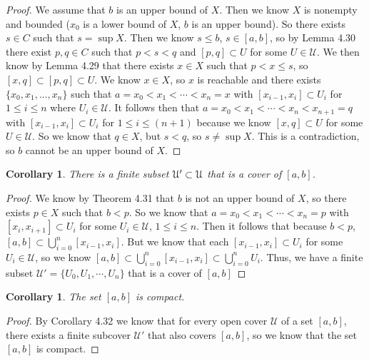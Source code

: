 \documentclass[12pt]{article}
\renewcommand{\_}[1]{\underline{ #1 }}
\newtheorem{corollary}[theorem]{Corollary}
\theoremstyle{definition}
\numberwithin{equation}{subsection}
\begin{document}
\begin{proof}
We assume that $b$ is an upper bound of $X$. Then we know $X$ is nonempty and bounded ($x_0$ is a lower bound of $X$, $b$ is an upper bound). So there exists $s \in C$ such that $s = \sup X$. Then we know $s \leq b$, $s \in [a,b]$, so by Lemma 4.30 there exist $p,q \in C$ such that $p < s < q$ and $[p,q] \subset U$ for some $U \in \mathcal{U}$. We then know by Lemma 4.29 that there exists $x \in X$ such that $p < x \leq s$, so $[x,q] \subset [p,q] \subset U$. We know $x \in X$, so $x$ is reachable and there exists $\{x_0,x_1,...,x_n\}$ such that $a = x_0 < x_1 < \dotsm < x_n = x$ with $[x_{i-1},x_i] \subset U_i$ for $1 \leq i \leq n$ where $U_i \in \mathcal{U}$. It follows then that $a = x_0 < x_1 < \dotsm < x_n < x_{n+1} = q$ with $[x_{i-1},x_i] \subset U_i$ for $1 \leq i \leq (n + 1)$ because we know $[x,q] \subset U$ for some $U \in \mathcal{U}$. So we know that $q \in X$, but $s < q$, so $s \not = \sup X$. This is a contradiction, so $b$ cannot be an upper bound of $X$.
\end{proof}

\begin{corollary}
There is a finite subset $\mathcal U'\subset\mathcal U$ that is a cover of $[a,b]$.
\end{corollary}

\begin{proof}
We know by Theorem 4.31 that $b$ is not an upper bound of $X$, so there exists $p \in X$ such that $b < p$. So we know that $a = x_0 < x_1 < \dotsm < x_n = p$ with $[x_i, x_{i+1}] \subset U_i$ for some $U_i \in \mathcal{U}$, $1 \leq i \leq n$. Then it follows that because $b < p$, $[a,b] \subset \bigcup_{i = 0}^{n} [x_{i-1},x_i]$. But we know that each $[x_{i-1},x_i] \subset U_i$ for some $U_i \in \mathcal{U}$, so we know $[a,b] \subset \bigcup_{i = 0}^{n} [x_{i-1},x_i] \subset \bigcup_{i = 0}^{n}U_i$. Thus, we have a finite subset $\mathcal{U'} = \{U_0, U_1, \dotsm, U_n\}$ that is a cover of $[a,b]$
\end{proof}

\begin{corollary}
The set $[a, b]$ is compact.
\end{corollary}

\begin{proof}
By Corollary 4.32 we know that for every open cover $\mathcal{U}$ of a set $[a,b]$, there exists a finite subcover $\mathcal{U'}$ that also covers $[a,b]$, so we know that the set $[a,b]$ is compact.
\end{proof}
\end{document}
